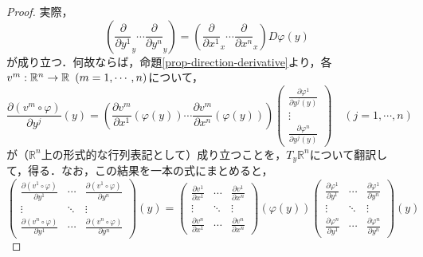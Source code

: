\documentclass[uplatex, 12pt, dvipdfmx]{jsarticle}
\begin{document}
\begin{proof}
    実際，
    \begin{equation} \left( \frac{\partial}{\partial y^1}_y \cdots \frac{\partial}{\partial y^n}_y \right) = \left( \frac{\partial}{\partial x^1}_x \cdots \frac{\partial}{\partial x^n}_x \right)D\varphi(y) \label{equation-change-of-basis-2}\end{equation}
    が成り立つ．何故ならば，命題\ref{prop-direction-derivative}より，各$v^m:\mathbb{R}^n\to\mathbb{R}\hspace{0.5em}(m=1,\cdots,n)$について，
    \[ \frac{\partial (v^m\circ \varphi)}{\partial y^j}(y) = \left( \frac{\partial v^m}{\partial x^1}(\varphi(y)) \cdots \frac{\partial v^m}{\partial x^n}(\varphi(y)) \right) \left( \begin{array}{c}
        \frac{\partial \varphi^1}{\partial y^j(y)} \\ \vdots \\ \frac{\partial \varphi^n}{\partial y^j(y)}
    \end{array} \right)\hspace{1em} (j=1,\cdots,n) \]
    が（$\mathbb{R}^n$上の形式的な行列表記として）成り立つことを，$T_y\mathbb{R}^n$について翻訳して，得る．なお，この結果を一本の式にまとめると，
    \[ \left(\begin{array}{lcr}
        \frac{\partial (v^1\circ\varphi)}{\partial y^1} &\cdots&  \frac{\partial (v^1\circ\varphi)}{\partial y^n} \\
        \vdots &\ddots& \vdots \\
        \frac{\partial (v^n\circ\varphi)}{\partial y^1} &\cdots& \frac{\partial (v^n\circ\varphi)}{\partial y^n}
    \end{array}\right)(y)
    =
    \left( \begin{array}{lcr}
        \frac{\partial v^1}{\partial x^1} &\cdots& \frac{\partial v^1}{\partial x^n} \\
        \vdots&\ddots&\vdots\\
        \frac{\partial v^n}{\partial x^1} &\cdots& \frac{\partial v^n}{\partial x^n}
    \end{array} \right)(\varphi(y))
    \left(\begin{array}{lcr}
        \frac{\partial \varphi^1}{\partial y^1} & \cdots & \frac{\partial \varphi^1}{\partial y^n}\\
        \vdots&\ddots&\vdots\\
        \frac{\partial \varphi^n}{\partial y^1} & \cdots & \frac{\partial \varphi^n}{\partial y^n}
    \end{array}\right)(y)    \]

\end{proof}
\end{document}
